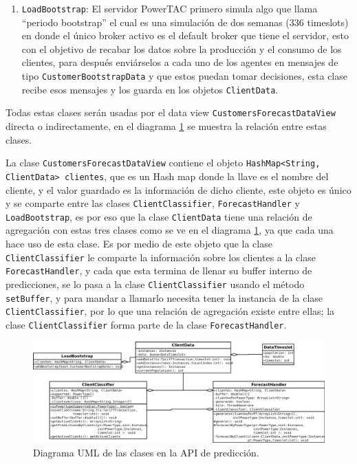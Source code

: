 \begin{enumerate}
	\item \texttt{LoadBootstrap}: El servidor PowerTAC primero simula algo que llama ``periodo bootstrap'' el cual es una simulación de dos semanas (336 timeslots) en donde el único broker activo es el default broker que tiene el servidor, esto con el objetivo de recabar los datos sobre la producción y el consumo de los clientes, para después enviárselos a cada uno de los agentes en mensajes de tipo \texttt{CustomerBootstrapData} y que estos puedan tomar decisiones, esta clase recibe esos mensajes y los guarda en los objetos \texttt{ClientData}.
\end{enumerate}

Todas estas clases serán usadas por el data view
\texttt{CustomersForecastDataView} directa o indirectamente,
 en el diagrama \ref{fig:clasesAPI} se muestra la relación entre estas clases.

La clase \texttt{CustomersForecastDataView} contiene el objeto \texttt{HashMap<String, ClientData> clientes}, que es un Hash map donde la llave es el nombre del cliente, y el valor guardado es la información de dicho cliente, este objeto es único y se comparte entre las clases \texttt{ClientClassifier}, \texttt{ForecastHandler} y \texttt{LoadBootstrap}, es por eso que la clase \texttt{ClientData} tiene una relación de agregación con estas tres clases como se ve en el diagrama \ref{fig:clasesAPI}, ya que cada una hace uso de esta clase. Es por medio de este objeto que la clase \texttt{ClientClassifier} le comparte la información sobre los clientes a la clase \texttt{ForecastHandler}, y cada que esta termina de llenar su buffer interno de predicciones, se lo pasa a la clase \texttt{ClientClassifier} usando el método \texttt{setBuffer}, y para mandar a llamarlo necesita tener la instancia de la clase \texttt{ClientClassifier}, por lo que una relación de agregación existe entre ellas; la clase \texttt{ClientClassifier} forma parte de la clase \texttt{ForecastHandler}.


\begin{figure}[ht]%
	\centering
	\includegraphics[width=15cm]{img/DiagramaUMLClasesAPI.png}
	\caption{Diagrama UML de las clases en la API de predicción.}
	\label{fig:clasesAPI}
\end{figure}

